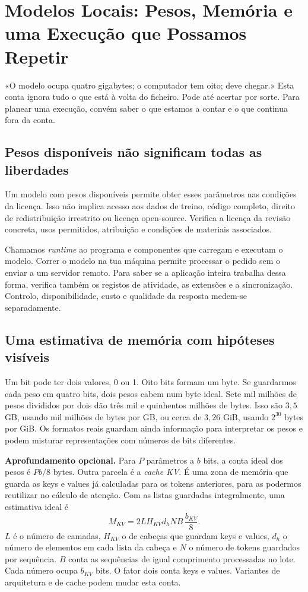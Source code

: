 \chapter{Modelos Locais: Pesos, Memória e uma Execução que Possamos Repetir}
\label{ch:local}

«O modelo ocupa quatro gigabytes; o computador tem oito; deve chegar.» Esta conta ignora tudo o que está à volta do ficheiro. Pode até acertar por sorte. Para planear uma execução, convém saber o que estamos a contar e o que continua fora da conta.

\section{Pesos disponíveis não significam todas as liberdades}
Um modelo com pesos disponíveis permite obter esses parâmetros nas condições da licença. Isso não implica acesso aos dados de treino, código completo, direito de redistribuição irrestrito ou licença open-source. Verifica a licença da revisão concreta, usos permitidos, atribuição e condições de materiais associados.

Chamamos \emph{runtime} ao programa e componentes que carregam e executam o modelo. Correr o modelo na tua máquina permite processar o pedido sem o enviar a um servidor remoto. Para saber se a aplicação inteira trabalha dessa forma, verifica também os registos de atividade, as extensões e a sincronização. Controlo, disponibilidade, custo e qualidade da resposta medem-se separadamente.

\section{Uma estimativa de memória com hipóteses visíveis}
Um bit pode ter dois valores, 0 ou 1. Oito bits formam um byte. Se guardarmos cada peso em quatro bits, dois pesos cabem num byte ideal. Sete mil milhões de pesos divididos por dois dão três mil e quinhentos milhões de bytes. Isso são $3{,}5$ GB, usando mil milhões de bytes por GB, ou cerca de $3{,}26$ GiB, usando $2^{30}$ bytes por GiB. Os formatos reais guardam ainda informação para interpretar os pesos e podem misturar representações com números de bits diferentes.

\textbf{Aprofundamento opcional.} Para $P$ parâmetros a $b$ bits, a conta ideal dos pesos é $Pb/8$ bytes. Outra parcela é a \emph{cache KV}. É uma zona de memória que guarda as keys e values já calculadas para os tokens anteriores, para as podermos reutilizar no cálculo de atenção. Com as listas guardadas integralmente, uma estimativa ideal é
\[
M_{KV}=2L H_{KV}d_h N B\,\frac{b_{KV}}8.
\]
$L$ é o número de camadas, $H_{KV}$ o de cabeças que guardam keys e values, $d_h$ o número de elementos em cada lista da cabeça e $N$ o número de tokens guardados por sequência. $B$ conta as sequências de igual comprimento processadas no lote. Cada número ocupa $b_{KV}$ bits. O fator dois conta keys e values. Variantes de arquitetura e de cache podem mudar esta conta.

